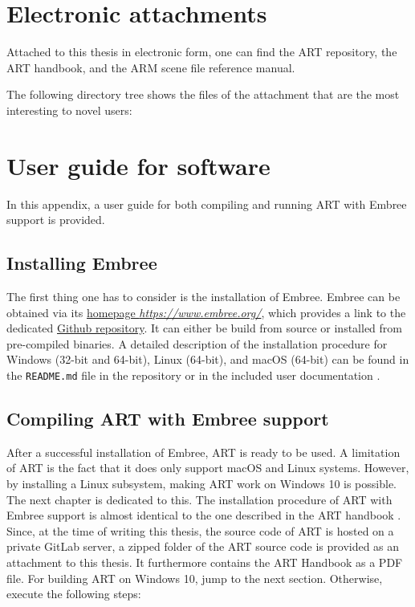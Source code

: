 \chapter{Electronic attachments} \label{chap:attachments}

Attached to this thesis in electronic form, one can find the ART repository, the ART handbook, and the ARM scene file reference manual.

The following directory tree shows the files of the attachment that are the most interesting to novel users:

\medspace


\chapter{User guide for software}

In this appendix, a user guide for both compiling and running ART with Embree support is provided. 

\section{Installing Embree}
\label{sec:embree_app}
The first thing one has to consider is the installation of Embree. Embree can be obtained via its \href{https://www.embree.org/}{homepage \emph{https://www.embree.org/}}, which provides a link to the dedicated \href{https://github.com/embree/embree}{Github repository}. It can either be build from source or installed from pre-compiled binaries. A detailed description of the installation procedure for Windows (32-bit and 64-bit), Linux (64-bit), and macOS (64-bit) can be found in the \texttt{README.md} file in the repository or in the included user documentation \cite{embree2021Doc}.

\section{Compiling ART with Embree support}
\label{art}
After a successful installation of Embree, ART is ready to be used. A limitation of ART is the fact that it does only support macOS and Linux systems. However, by installing a Linux subsystem, making ART work on Windows 10 is possible. The next chapter is dedicated to this.
The installation procedure of ART with Embree support is almost identical to the one described in the ART handbook \cite{arthandbook}. Since, at the time of writing this thesis, the source code of ART is hosted on a private GitLab server, a zipped folder of the ART source code is provided as an attachment to this thesis. It furthermore contains the ART Handbook as a PDF file. For building ART on Windows 10, jump to the next section. Otherwise, execute the following steps:

